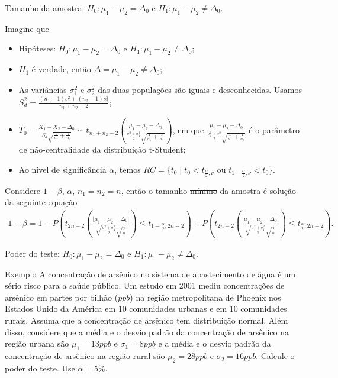 \documentclass[9pt]{beamer}
\begin{document}
\begin{frame}{Tamanho da amostra: $H_0:\mu_1 - \mu_2 = \Delta_0$ e $H_1: \mu_1 - \mu_2 \neq \Delta_0$.}

\footnotesize

Imagine que
\begin{itemize}
\item Hipóteses: $H_0: \mu_1 - \mu_2 = \Delta_0$ e $H_1: \mu_1 -  \mu_2 \neq \Delta_0$;
\item $H_1$ é verdade, então $\Delta = \mu_1-\mu_2 \neq \Delta_0$;
\item As variâncias $\sigma_1^2$  e $\sigma_2^2$ das duas populações são iguais e desconhecidas. Usamos $S_d^2 = \frac{(n_1-1)s_1^2 + (n_2-1)s_2^2}{n_1+n_2-2}$;
\item $T_0 = \frac{\bar{X}_1 - \bar{X}_2 - \Delta_0}{ S_d \sqrt{ \frac{1}{n_1} + \frac{1}{n_2} } } \sim t_{n_1+n_2-2}\left( \frac{\mu_1 - \mu_2 - \Delta_0}{\frac{\sigma_1^2 + \sigma_1^2}{2} \sqrt{\frac{1}{n_1} + \frac{1}{n_2}}} \right)$, em que $\frac{\mu_1 - \mu_2 - \Delta_0}{\frac{\sigma_1^2 + \sigma_1^2}{2} \sqrt{\frac{1}{n_1} + \frac{1}{n_2}}}$ é o parâmetro de não-centralidade da distribuição t-Student;
\item Ao nível de significância $\alpha$, temos $RC = \{ t_0 \mid t_0 < t_{\frac{\alpha}{2};\nu} \mbox{ ou } t_{1-\frac{\alpha}{2};\nu} < t_0  \}$.
\end{itemize}
\vfill

Considere $1-\beta$, $\alpha$, $n_1=n_2=n$, então o tamanho \sout{mínimo} da amostra é solução da seguinte equação
\scriptsize
\begin{align*}
1-\beta = 1 - P\left( t_{2n-2}\left( \frac{\lvert \mu_1 - \mu_2 - \Delta_0 \rvert}{\sqrt{\frac{\sigma_1^2 + \sigma_1^2}{2}} \sqrt{\frac{2}{n}}} \right) \leq t_{1-\frac{\alpha}{2};2n-2} \right)+P\left( t_{2n-2}\left( \frac{\lvert \mu_1 - \mu_2 - \Delta_0\rvert}{\sqrt{\frac{\sigma_1^2 + \sigma_1^2}{2}} \sqrt{\frac{2}{n}}} \right) \leq t_{\frac{\alpha}{2};2n-2} \right).
\end{align*}

\normalsize
\end{frame}

\begin{frame}{Poder do teste: $H_0:\mu_1 - \mu_2 = \Delta_0$ e $H_1: \mu_1 - \mu_2 \neq \Delta_0$.}

\begin{block}{Exemplo}
	A concentração de arsênico no sistema de abastecimento de água é um sério risco para a saúde público. Um estudo em 2001 	mediu concentrações de arsênico em partes por bilhão ($ppb$) na região metropolitana de Phoenix nos Estados Unido da América em 10 comunidades urbanas e em 10 comunidades rurais. Assuma que a concentração de arsênico tem distribuição normal. Além disso, considere que a média e o desvio padrão da concentração de arsênico na região urbana são $\mu_1 = 13 ppb$ e $\sigma_1=8 ppb$ e a média e o desvio padrão da concentração de arsênico na região rural são $\mu_2=28 ppb$ e $\sigma_2=16 ppb$. Calcule o poder do teste. Use $\alpha=5\%$.	
\end{block}

\end{frame}
\end{document}
